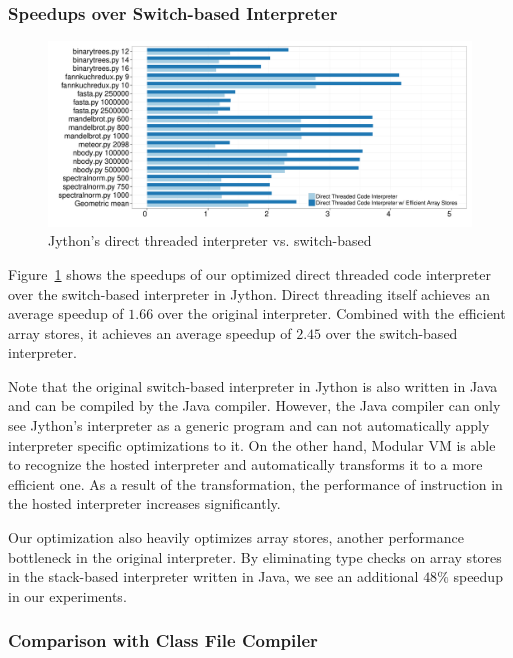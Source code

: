 \subsubsection{Speedups over Switch-based Interpreter}

\begin{figure}[t]
\centering
\includegraphics[scale=.44]{figures/ch2-benchmark-jython-direct-threading-rawinterpreter.pdf}
\caption{Jython's direct threaded interpreter vs. switch-based}
\label{fig:benchmark-jython-direct-threading-rawinterpreter}
\end{figure}

Figure~\ref{fig:benchmark-jython-direct-threading-rawinterpreter} shows the speedups of our optimized direct threaded code interpreter over the switch-based interpreter in Jython.
Direct threading itself achieves an average speedup of $1.66$ over the original interpreter.
Combined with the efficient array stores, it achieves an average speedup of $2.45$ over the switch-based interpreter.

Note that the original switch-based interpreter in Jython is also written in Java and can be compiled by the Java compiler.
However, the Java compiler can only see Jython's interpreter as a generic program and can not automatically apply interpreter specific optimizations to it.
On the other hand, Modular VM is able to recognize the hosted interpreter and automatically transforms it to a more efficient one.
As a result of the transformation, the performance of instruction in the hosted interpreter increases significantly.

Our optimization also heavily optimizes array stores, another performance bottleneck in the original interpreter.
By eliminating type checks on array stores in the stack-based interpreter written in Java, we see an additional $48\%$ speedup in our experiments.

\subsubsection{Comparison with Class File Compiler}


